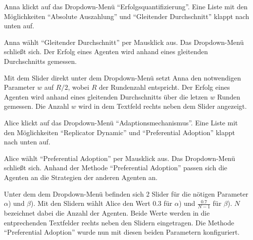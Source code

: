 \documentclass[parskip=full,11pt]{scrartcl}
\begin{document}

{Anna klickt auf das Dropdown-Menü \enquote{Erfolgsquantifizierung}.}
{Eine Liste mit den Möglichkeiten \enquote{Absolute Auszahlung} und  \enquote{Gleitender Durchschnitt} klappt nach unten auf.}

{Anna wählt \enquote{Gleitender Durchschnitt} per Mausklick aus.}
{Das Dropdown-Menü schließt sich. Der Erfolg eines Agenten wird anhand eines gleitenden Durchschnitts gemessen.}

{Mit dem Slider direkt unter dem Dropdown-Menü setzt Anna den notwendigen Parameter \(w\) auf \(R/2\), wobei \(R\) der Rundenzahl entspricht.}
{Der Erfolg eines Agenten wird anhand eines gleitenden Durchschnitts über die letzen \(w\) Runden gemessen. Die Anzahl \(w\) wird in dem Textfeld rechts neben dem Slider angezeigt.}


{Alice klickt auf das Dropdown-Menü \enquote{Adaptionsmechanismus}.}
{Eine Liste mit den Möglichkeiten \enquote{Replicator Dynamic} und  \enquote{Preferential Adoption} klappt nach unten auf.}

{Alice wählt \enquote{Preferential Adoption} per Mausklick aus.}
{Das Dropdown-Menü schließt sich. Anhand der Methode  \enquote{Preferential Adoption} passen sich die Agenten an die Strategien der anderen Agenten an.}

{Unter dem dem Dropdown-Menü befinden sich 2 Slider für die nötigen Parameter \(\alpha\)) und \(\beta\)). Mit den Slidern wählt Alice den Wert 0.3 für \(\alpha\)) und \(\frac{0.7}{N - 1}\) für  \(\beta\)). \(N\) bezeichnet dabei die Anzahl der Agenten.}
{Beide Werte werden in die entprechenden Textfelder rechts neben den Slidern eingetragen. Die Methode \enquote{Preferential Adoption} wurde nun mit diesen beiden Parametern konfiguriert.}
\end{document}
